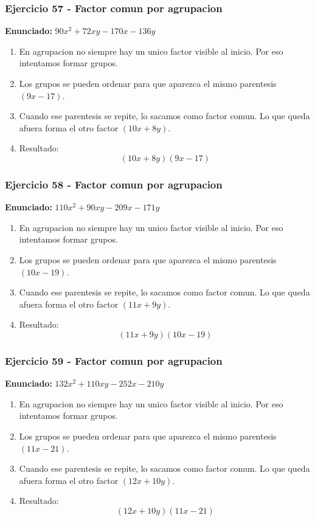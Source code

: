 \documentclass[11pt,a4paper]{article}
\begin{document}
\vspace{0.2cm}
\subsubsection*{Ejercicio 57 - Factor comun por agrupacion}
\textbf{Enunciado:} $ 90 x^{2} + 72 x y - 170 x - 136 y $\par
\begin{enumerate}[leftmargin=2em]
\item En agrupacion no siempre hay un unico factor visible al inicio. Por eso intentamos formar grupos.
\item Los grupos se pueden ordenar para que aparezca el mismo parentesis \((9 x - 17)\).
\item Cuando ese parentesis se repite, lo sacamos como factor comun. Lo que queda afuera forma el otro factor \((10 x + 8 y)\).
\item Resultado: \[\boxed{\left(10 x + 8 y\right)\left(9 x - 17\right)}\]
\end{enumerate}

\vspace{0.2cm}
\subsubsection*{Ejercicio 58 - Factor comun por agrupacion}
\textbf{Enunciado:} $ 110 x^{2} + 90 x y - 209 x - 171 y $\par
\begin{enumerate}[leftmargin=2em]
\item En agrupacion no siempre hay un unico factor visible al inicio. Por eso intentamos formar grupos.
\item Los grupos se pueden ordenar para que aparezca el mismo parentesis \((10 x - 19)\).
\item Cuando ese parentesis se repite, lo sacamos como factor comun. Lo que queda afuera forma el otro factor \((11 x + 9 y)\).
\item Resultado: \[\boxed{\left(11 x + 9 y\right)\left(10 x - 19\right)}\]
\end{enumerate}

\vspace{0.2cm}
\subsubsection*{Ejercicio 59 - Factor comun por agrupacion}
\textbf{Enunciado:} $ 132 x^{2} + 110 x y - 252 x - 210 y $\par
\begin{enumerate}[leftmargin=2em]
\item En agrupacion no siempre hay un unico factor visible al inicio. Por eso intentamos formar grupos.
\item Los grupos se pueden ordenar para que aparezca el mismo parentesis \((11 x - 21)\).
\item Cuando ese parentesis se repite, lo sacamos como factor comun. Lo que queda afuera forma el otro factor \((12 x + 10 y)\).
\item Resultado: \[\boxed{\left(12 x + 10 y\right)\left(11 x - 21\right)}\]
\end{enumerate}
\end{document}
